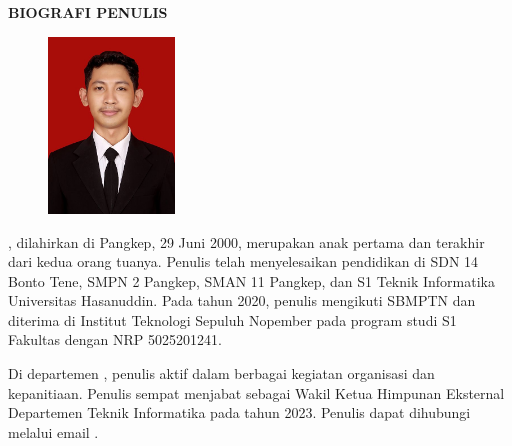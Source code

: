 \begin{center}
  \Large
  \textbf{BIOGRAFI PENULIS}
\end{center}


\vspace{2ex}

\begin{figure}
  \centering
  \vspace{-3ex}
  \includegraphics[width=0.3\textwidth]{gambar/jabalnur.jpeg}
  \vspace{-4ex}
\end{figure}

\name{}, dilahirkan di Pangkep, 29 Juni 2000, merupakan anak pertama dan terakhir
dari kedua orang tuanya. Penulis telah menyelesaikan pendidikan di SDN 14 Bonto Tene, 
SMPN 2 Pangkep, SMAN 11 Pangkep, dan S1 Teknik Informatika Universitas Hasanuddin. Pada
tahun 2020, penulis mengikuti SBMPTN dan diterima di Institut Teknologi Sepuluh Nopember
pada program studi S1 \department{} Fakultas \facultyshort{} \institute{} dengan NRP 5025201241.

Di departemen \department{}, penulis aktif dalam berbagai kegiatan organisasi 
dan kepanitiaan. Penulis sempat menjabat sebagai Wakil Ketua Himpunan Eksternal
Departemen Teknik Informatika pada tahun 2023. Penulis dapat dihubungi melalui 
email \href{mailto:\email}{\email}.

